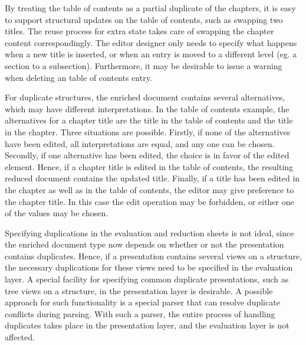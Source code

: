 By treating the table of contents as a partial duplicate of the chapters, it is easy to support structural updates on the table of contents, such as swapping two titles. The reuse process for extra state takes care of swapping the chapter content correspondingly. The editor designer only needs to specify what happens when a new title is inserted, or when an entry is moved to a different level (eg. a section to a subsection). Furthermore, it may be desirable to issue a warning when deleting an table of contents entry.

\bc
For duplicate structures, the enriched document contains several alternatives, which may have different interpretations. In the table of contents example, the alternatives for a chapter title are the title in the table of contents and the title in the chapter. Three situations are possible. Firstly, if none of the alternatives have been edited, all interpretations are equal, and any one can be chosen. Secondly, if one alternative has been edited, the choice is in favor of the edited element. Hence, if a chapter title is edited in the table of contents, the resulting reduced document contains the updated title. Finally, if a title has been edited in the chapter as well as in the table of contents, the editor may give preference to the chapter title. In this case the edit operation may be forbidden, or either one of the values may be chosen.
\ec

\bc
Specifying duplications in the evaluation and reduction sheets is not ideal, since the enriched document type now depends on whether or not the presentation contains duplicates. Hence, if a presentation contains several views on a structure, the necessary duplications for these views need to be specified in the evaluation layer. A special facility for specifying common duplicate presentations, such as tree views on a structure, in the presentation layer is desirable. A possible approach for such functionality is a special parser that can resolve duplicate conflicts during parsing. With such a parser, the entire process of handling duplicates takes place in the presentation layer, and the evaluation layer is not affected. 
\ec










